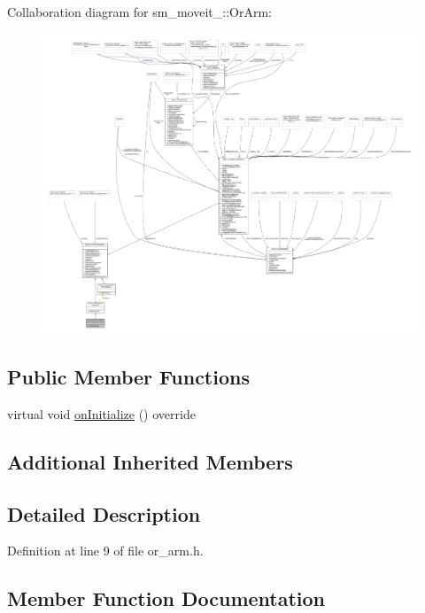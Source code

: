 Collaboration diagram for sm\+\_\+moveit\+\_\+:\+:Or\+Arm\+:
\nopagebreak
\begin{figure}[H]
\begin{center}
\leavevmode
\includegraphics[width=350pt]{classsm__moveit__4_1_1OrArm__coll__graph}
\end{center}
\end{figure}
\subsection*{Public Member Functions}
\begin{DoxyCompactItemize}
\item 
virtual void \hyperlink{classsm__moveit__4_1_1OrArm_a9269c0a4712d81a1ee18640c66fef0ff}{on\+Initialize} () override
\end{DoxyCompactItemize}
\subsection*{Additional Inherited Members}


\subsection{Detailed Description}


Definition at line 9 of file or\+\_\+arm.\+h.



\subsection{Member Function Documentation}
\mbox{\label{classsm__moveit__4_1_1OrArm_a9269c0a4712d81a1ee18640c66fef0ff}} 
